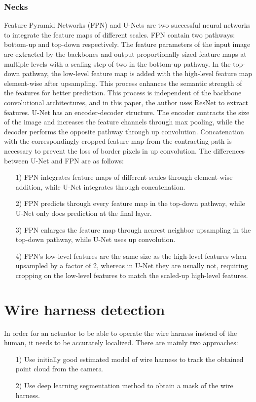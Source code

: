 \subsubsection{Necks}
    Feature Pyramid Networks (FPN)\cite{8099589} and U-Nets\cite{10.1007/978-3-319-24574-4_28} are two successful neural networks to integrate the feature maps of different scales.
    FPN contain two pathways: bottom-up and top-down respectively. The feature parameters 
    of the input image are extracted by the backbones and output proportionally sized feature maps at multiple levels with a scaling step of two in the bottom-up pathway. 
    In the top-down pathway, the low-level feature map is added with the high-level feature map element-wise after upsampling. This process enhances the semantic strength 
    of the features for better prediction. This process is independent of the backbone convolutional architectures, and in this paper, the author uses ResNet to extract features.
    U-Net has an encoder-decoder structure. The encoder contracts the size of the image 
    and increases the feature channels through max pooling, while the decoder performs the opposite pathway through up convolution. Concatenation with the correspondingly 
    cropped feature map from the contracting path is necessary to prevent the loss of border pixels in up convolution. The differences between U-Net and FPN are as follows:
    \begin{itemize}
    \item [1)] FPN integrates feature maps of different scales through element-wise addition, while U-Net integrates through concatenation.      
    \item [2)] FPN predicts through every feature map in the top-down pathway, while U-Net only does prediction at the final layer.
    \item [3)] FPN enlarges the feature map through nearest neighbor upsampling in the top-down pathway, while U-Net uses up convolution. 
    \item [4)] FPN's low-level features are the same size as the high-level features when upsampled by a factor of 2, whereas in U-Net 
    they are usually not, requiring cropping on the low-level features to match the scaled-up high-level features.
    \end{itemize}
\section{Wire harness detection}
    In order for an actuator to be able to operate the wire harness instead of the human, it needs to be accurately localized. There are mainly two approaches: 
    \begin{itemize}
        \item [1)] Use initially good estimated model of wire harness to track the obtained point cloud from the camera.
        \item [2)] Use deep learning segmentation method to obtain a mask of the wire harness.
    \end{itemize}
